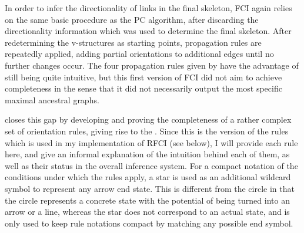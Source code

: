 In order to infer the directionality of links in the final skeleton, FCI again relies on the same basic procedure as the PC algorithm, after discarding the directionality information which was used to determine the final skeleton. After redetermining the v-structures as starting points, propagation rules are repeatedly applied, adding partial orientations to additional edges until no further changes occur. The four propagation rules given by \cite{spirtes_ea_2000} have the advantage of still being quite intuitive, but this first version of FCI did not aim to achieve completeness in the sense that it did not necessarily output the most specific maximal ancestral graphs.

\cite{zhang2008} closes this gap by developing and proving the completeness of a rather complex set of orientation rules, giving rise to the . Since this is the version of the rules which is used in my implementation of RFCI (see below), I will provide each rule here, and give an informal explanation of the intuition behind each of them, as well as their status in the overall inference system. For a compact notation of the conditions under which the rules apply, a star is used as an additional wildcard symbol to represent any arrow end state. This is different from the circle in that the circle represents a concrete state with the potential of being turned into an arrow or a line, whereas the star does not correspond to an actual state, and is only used to keep rule notations compact by matching any possible end symbol.


